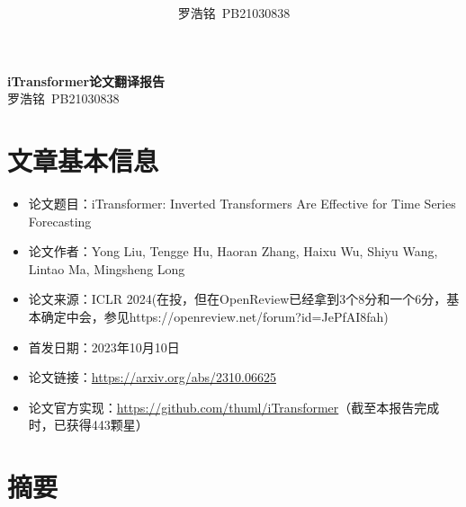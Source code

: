 \documentclass[twoside,12pt]{article}
\title{ }
\author{罗浩铭\ PB21030838}
\begin{document}
\fancyhf{} %
\fancyfoot[C]{\thepage} %
\fancyhead[l]{\footnotesize  }

\renewcommand{\headrulewidth}{0pt} %

\begin{center}
  \textbf{\LARGE{iTransformer论文翻译报告}}\\
  \vspace{0.2cm}
  \large{罗浩铭\ PB21030838}
\end{center}


\section{文章基本信息}

\begin{itemize}
  \item 论文题目：iTransformer: Inverted Transformers Are Effective for Time Series Forecasting~\citep{itransformer}
  \item 论文作者：Yong Liu, Tengge Hu, Haoran Zhang, Haixu Wu, Shiyu Wang, Lintao Ma, Mingsheng Long
  \item 论文来源：ICLR 2024(在投，但在OpenReview已经拿到3个8分和一个6分，基本确定中会，参见https://openreview.net/forum?id=JePfAI8fah)
  \item 首发日期：2023年10月10日
  \item 论文链接：\url{https://arxiv.org/abs/2310.06625}
  \item 论文官方实现：\url{https://github.com/thuml/iTransformer}（截至本报告完成时，已获得443颗星）
\end{itemize}

\section{摘要}
\end{document}
